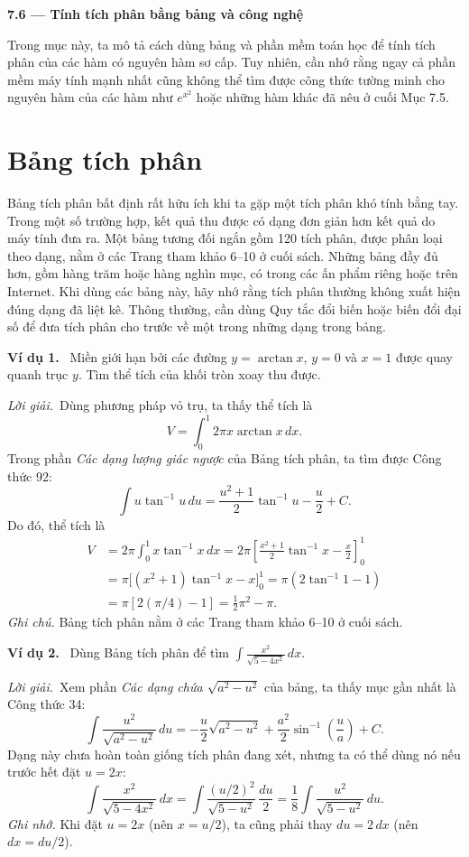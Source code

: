 \documentclass[12pt,a4paper]{article}
\newcommand{\ex}[1]{\par\medskip\noindent\textbf{Ví dụ #1.}\ }
\newcommand{\sol}{\par\nopagebreak[4]\noindent\textit{Lời giải.}\ }
\begin{document}
\begin{center}{\Large\bfseries 7.6 — Tính tích phân bằng bảng và công nghệ}\end{center}
Trong mục này, ta mô tả cách dùng bảng và phần mềm toán học để tính tích phân của các hàm có nguyên hàm sơ cấp. Tuy nhiên, cần nhớ rằng ngay cả phần mềm máy tính mạnh nhất cũng không thể tìm được công thức tường minh cho nguyên hàm của các hàm như $e^{x^2}$ hoặc những hàm khác đã nêu ở cuối Mục 7.5.

\section*{Bảng tích phân}
Bảng tích phân bất định rất hữu ích khi ta gặp một tích phân khó tính bằng tay. Trong một số trường hợp, kết quả thu được có dạng đơn giản hơn kết quả do máy tính đưa ra. Một bảng tương đối ngắn gồm 120 tích phân, được phân loại theo dạng, nằm ở các Trang tham khảo 6–10 ở cuối sách. Những bảng đầy đủ hơn, gồm hàng trăm hoặc hàng nghìn mục, có trong các ấn phẩm riêng hoặc trên Internet. Khi dùng các bảng này, hãy nhớ rằng tích phân thường không xuất hiện đúng dạng đã liệt kê. Thông thường, cần dùng Quy tắc đổi biến hoặc biến đổi đại số để đưa tích phân cho trước về một trong những dạng trong bảng.

\ex{1} Miền giới hạn bởi các đường $y=\arctan x$, $y=0$ và $x=1$ được quay quanh trục $y$. Tìm thể tích của khối tròn xoay thu được.
\sol Dùng phương pháp vỏ trụ, ta thấy thể tích là
\[V=\int_0^1 2\pi x\arctan x\,dx.\]
Trong phần \textit{Các dạng lượng giác ngược} của Bảng tích phân, ta tìm được Công thức 92:
\[\int u\tan^{-1}u\,du=\frac{u^2+1}{2}\tan^{-1}u-\frac u2+C.\]
Do đó, thể tích là
\begin{align*}
V&=2\pi\int_0^1 x\tan^{-1}x\,dx
=2\pi\left[\frac{x^2+1}{2}\tan^{-1}x-\frac x2\right]_0^1\\
&=\pi\bigl[(x^2+1)\tan^{-1}x-x\bigr]_0^1
=\pi(2\tan^{-1}1-1)\\
&=\pi[2(\pi/4)-1]=\frac12\pi^2-\pi.
\end{align*}
\textit{Ghi chú.} Bảng tích phân nằm ở các Trang tham khảo 6–10 ở cuối sách.

\ex{2} Dùng Bảng tích phân để tìm $\displaystyle\int\frac{x^2}{\sqrt{5-4x^2}}\,dx$.
\sol Xem phần \textit{Các dạng chứa $\sqrt{a^2-u^2}$} của bảng, ta thấy mục gần nhất là Công thức 34:
\[\int\frac{u^2}{\sqrt{a^2-u^2}}\,du
=-\frac u2\sqrt{a^2-u^2}+\frac{a^2}{2}\sin^{-1}\left(\frac ua\right)+C.\]
Dạng này chưa hoàn toàn giống tích phân đang xét, nhưng ta có thể dùng nó nếu trước hết đặt $u=2x$:
\[\int\frac{x^2}{\sqrt{5-4x^2}}\,dx
=\int\frac{(u/2)^2}{\sqrt{5-u^2}}\,\frac{du}{2}
=\frac18\int\frac{u^2}{\sqrt{5-u^2}}\,du.\]
\textit{Ghi nhớ.} Khi đặt $u=2x$ (nên $x=u/2$), ta cũng phải thay $du=2\,dx$ (nên $dx=du/2$).
\end{document}
